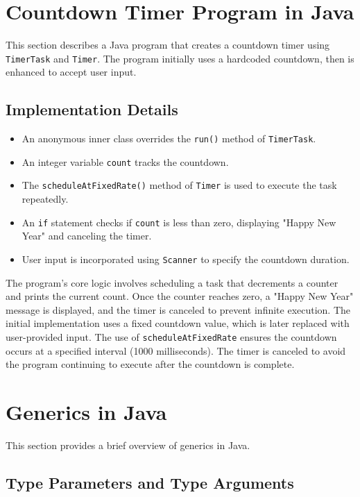 \documentclass{article}
\begin{document}
\begin{itemize}
\section*{Countdown Timer Program in Java}

This section describes a Java program that creates a countdown timer using \texttt{TimerTask} and \texttt{Timer}.  The program initially uses a hardcoded countdown, then is enhanced to accept user input.

\subsection*{Implementation Details}

\begin{itemize}
    \item An anonymous inner class overrides the \texttt{run()} method of \texttt{TimerTask}.
    \item An integer variable \texttt{count} tracks the countdown.
    \item The \texttt{scheduleAtFixedRate()} method of \texttt{Timer} is used to execute the task repeatedly.
    \item An \texttt{if} statement checks if \texttt{count} is less than zero, displaying "Happy New Year" and canceling the timer.
    \item User input is incorporated using \texttt{Scanner} to specify the countdown duration.
\end{itemize}

The program's core logic involves scheduling a task that decrements a counter and prints the current count. Once the counter reaches zero, a "Happy New Year" message is displayed, and the timer is canceled to prevent infinite execution.  The initial implementation uses a fixed countdown value, which is later replaced with user-provided input.  The use of \texttt{scheduleAtFixedRate} ensures the countdown occurs at a specified interval (1000 milliseconds). The timer is canceled to avoid the program continuing to execute after the countdown is complete.


\section*{Generics in Java}

This section provides a brief overview of generics in Java.

\subsection*{Type Parameters and Type Arguments}


\end{itemize}
\end{document}
